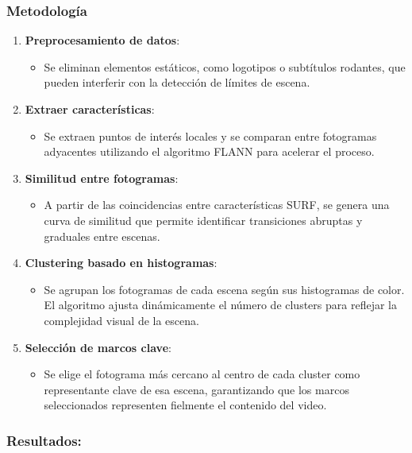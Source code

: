 \subsubsection {Metodología }
\begin{enumerate}
	\item \textbf{Preprocesamiento de datos}:
	\begin{itemize}
		\item  Se eliminan elementos estáticos, como logotipos o subtítulos rodantes, que pueden interferir con la detección de límites de escena.
	\end{itemize}
	
	\item \textbf{Extraer características}:
	\begin{itemize}
		\item  Se extraen puntos de interés locales y se comparan entre fotogramas adyacentes utilizando el algoritmo FLANN para acelerar el proceso.
	\end{itemize}
	
	\item \textbf{Similitud entre fotogramas}:
	\begin{itemize}
		\item A partir de las coincidencias entre características SURF, se genera una curva de similitud que permite identificar transiciones abruptas y graduales entre escenas.
	\end{itemize}
	
	\item \textbf{Clustering basado en histogramas}:
	\begin{itemize}
		\item Se agrupan los fotogramas de cada escena según sus histogramas de color. El algoritmo ajusta dinámicamente el número de clusters para reflejar la complejidad visual de la escena.
	\end{itemize}
	
	\item \textbf{Selección de marcos clave}:
	\begin{itemize}
		\item  Se elige el fotograma más cercano al centro de cada cluster como representante clave de esa escena, garantizando que los marcos seleccionados representen fielmente el contenido del video.
	\end{itemize}
\end{enumerate}
	
\subsubsection{Resultados:}

